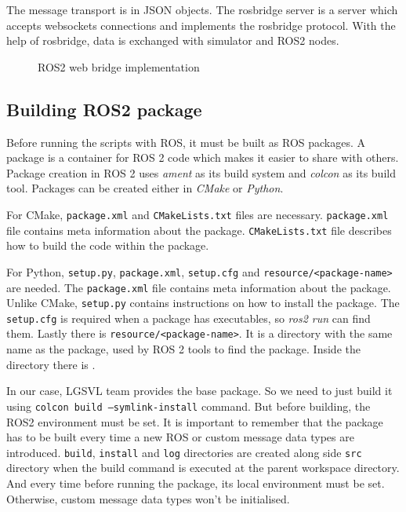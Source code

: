 The message transport is in JSON objects. The rosbridge server is a server which accepts websockets connections and implements the rosbridge protocol.
With the help of rosbridge, data is exchanged with
simulator and ROS2 nodes.

\begin{figure}[!ht]
	\centering
    \def\svgwidth{0.8\textwidth}
    \caption{ROS2 web bridge implementation}
    \label{fig:ros2webbridge}
\end{figure}

\iffalse
\subsection{Building ROS2 package}
Before running the scripts with ROS, it must be built as ROS packages.  A package is a
container for ROS 2 code which makes it easier to share with others. Package creation in
ROS 2 uses \textit{ament} as its build system and \textit{colcon} as its build tool.
Packages can be created either in \textit{CMake} or \textit{Python}.

For CMake, \texttt{package.xml} and \texttt{CMakeLists.txt} files are necessary. \texttt{package.xml}
file contains meta information about the package. \texttt{CMakeLists.txt} file describes how to build the code within the package.

For Python, \texttt{setup.py}, \texttt{package.xml}, \texttt{setup.cfg} and
\texttt{resource/<package-name>} are needed. The \texttt{package.xml} file contains meta
information about the package. Unlike CMake, \texttt{setup.py} contains instructions on
how to install the package. The \texttt{setup.cfg} is required when a package has
executables, so \textit{ros2 run} can find them. Lastly there is
\texttt{resource/<package-name>}. It is a directory with the same name as the package,
used by ROS 2 tools to find the package. Inside the directory there is \texttt{}.

In our case, LGSVL team provides the base package. So we need to just build it using
\texttt{colcon build --symlink-install} command. But before building, the ROS2 environment
 must be set. It is important to remember that the package has
to be built every time a new ROS or custom message data types are introduced. \texttt{build},
\texttt{install} and \texttt{log} directories are created along side \texttt{src}
directory when the build command is executed at the parent workspace directory. And
every time before running the package, its local environment must be set. Otherwise,
custom message data types won't be initialised.

